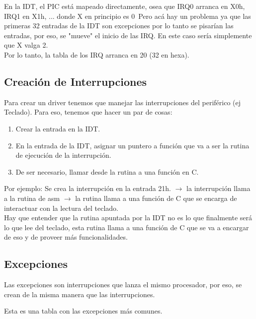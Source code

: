 \documentclass[]{article}
\begin{document}
En la IDT, el PIC est\'a mapeado directamente, osea que IRQ0 arranca en X0h, IRQ1 en X1h, ... donde X en principio es 0\
Pero ac\'a hay un problema ya que las primeras 32 entradas de la IDT son excepciones
por lo tanto se pisar\'ian las entradas, por eso, se "mueve" el inicio de las IRQ.
En este caso ser\'ia simplemente que X valga 2.\\

Por lo tanto, la tabla de los IRQ arranca en 20 (32 en hexa).

\subsection*{Creaci\'on de Interrupciones}
Para crear un driver tenemos que manejar las interrupciones del perif\'erico (ej Teclado).
Para eso, tenemos que hacer un par de cosas:

\begin{center}
	\begin{enumerate}
		\item Crear la entrada en la IDT.
		\item En la entrada de la IDT, asignar un puntero a funci\'on que va a ser la rutina
		de ejecuci\'on de la interrupci\'on.
		\item De ser necesario, llamar desde la rutina a una funci\'on en C.
	\end{enumerate}
\end{center}

Por ejemplo: Se crea la interrupci\'on en la entrada 21h. $\longrightarrow$ la interrupci\'on llama a la rutina de asm $\longrightarrow$ la rutina llama a una funci\'on de C que se encarga de interactuar con la lectura del teclado.\\

Hay que entender que la rutina apuntada por la IDT no es lo que finalmente ser\'a lo que lee del teclado, esta rutina llama a una funci\'on de C que se va a encargar de eso y de proveer m\'as funcionalidades.

\subsection*{Excepciones}

Las excepciones son interrupciones que lanza el mismo procesador, por eso, se crean de la misma manera que las interrupciones.

Esta es una tabla con las excepciones m\'as comunes.
\end{document}
